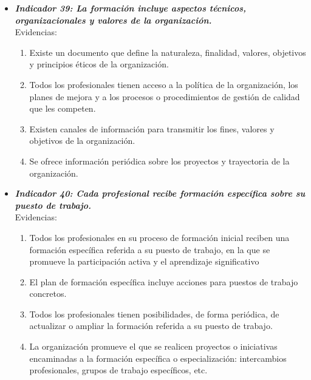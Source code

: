 \begin{itemize}
\begin{itemize}
\begin{itemize}
			\item \textbf{\textit{Indicador 39: La formación incluye aspectos técnicos, organizacionales y valores de la organización.}}\\Evidencias:
			\begin{enumerate}
				\item Existe un documento que define la naturaleza, finalidad, valores, objetivos y principios éticos de la organización. 
				\item Todos los profesionales tienen acceso a la política de la organización, los planes de mejora y a los procesos o procedimientos de gestión de calidad que les competen. 
				\item Existen canales de información para transmitir los fines, valores y objetivos de la organización. 
				\item Se ofrece información periódica sobre los proyectos y trayectoria de la organización. 
				 
			\end{enumerate}
			

			\item \textbf{\textit{Indicador 40: Cada profesional recibe formación específica sobre su puesto de trabajo.}}\\Evidencias:
			\begin{enumerate}
				\item Todos los profesionales en su proceso de formación inicial reciben una formación específica referida a su puesto de trabajo, en la que se promueve la participación activa y el aprendizaje significativo 
				\item El plan de formación específica incluye acciones para puestos de trabajo concretos. 
				\item Todos los profesionales tienen posibilidades, de forma periódica, de actualizar o ampliar la formación referida a su puesto de trabajo. 
				\item La organización promueve el que se realicen proyectos o iniciativas encaminadas a la formación específica o especialización: intercambios profesionales, grupos de trabajo específicos, etc. 
				 
			\end{enumerate}
			


\end{itemize}
\end{itemize}
\end{itemize}
